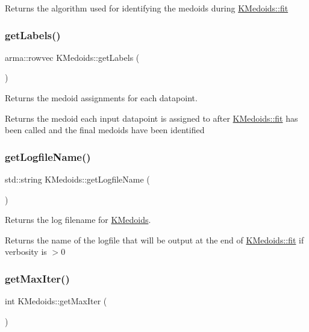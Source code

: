 Returns the algorithm used for identifying the medoids during \hyperlink{classKMedoids_ae241800e72a6b4a677333ffbf06e1798}{K\+Medoids\+::fit} \mbox{\label{classKMedoids_a89474787892880381e4d0282de541d03}} 
\subsubsection{\texorpdfstring{get\+Labels()}{getLabels()}}
{\footnotesize\ttfamily arma\+::rowvec K\+Medoids\+::get\+Labels (\begin{DoxyParamCaption}{ }\end{DoxyParamCaption})}



Returns the medoid assignments for each datapoint. 

Returns the medoid each input datapoint is assigned to after \hyperlink{classKMedoids_ae241800e72a6b4a677333ffbf06e1798}{K\+Medoids\+::fit} has been called and the final medoids have been identified \mbox{\label{classKMedoids_ad5982ef2a71cce9f1f45b98c55350391}} 
\subsubsection{\texorpdfstring{get\+Logfile\+Name()}{getLogfileName()}}
{\footnotesize\ttfamily std\+::string K\+Medoids\+::get\+Logfile\+Name (\begin{DoxyParamCaption}{ }\end{DoxyParamCaption})}



Returns the log filename for \hyperlink{classKMedoids}{K\+Medoids}. 

Returns the name of the logfile that will be output at the end of \hyperlink{classKMedoids_ae241800e72a6b4a677333ffbf06e1798}{K\+Medoids\+::fit} if verbosity is $>$0 \mbox{\label{classKMedoids_ac0569206113015abb38954f78a194eb5}} 
\subsubsection{\texorpdfstring{get\+Max\+Iter()}{getMaxIter()}}
{\footnotesize\ttfamily int K\+Medoids\+::get\+Max\+Iter (\begin{DoxyParamCaption}{ }\end{DoxyParamCaption})}



